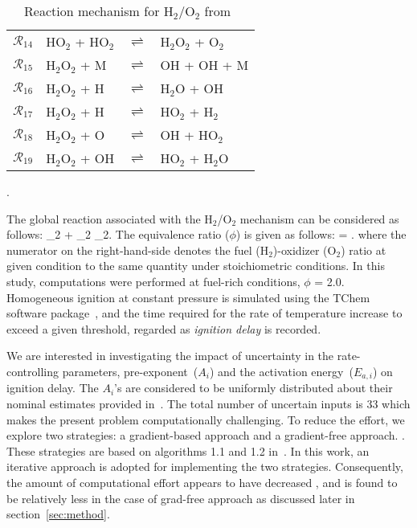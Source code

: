 \begin{table}[htbp]
\begin{center}
\begin{tabular}{llll}
$\mathcal{R}_{14}$ & HO$_2$ + HO$_2$ & $\rightleftharpoons$ & H$_2$O$_2$ + O$_2$ \\
$\mathcal{R}_{15}$ & H$_2$O$_2$ + M  & $\rightleftharpoons$ & OH + OH + M \\
$\mathcal{R}_{16}$ & H$_2$O$_2$ + H  & $\rightleftharpoons$ & H$_2$O + OH \\
$\mathcal{R}_{17}$ & H$_2$O$_2$ + H  & $\rightleftharpoons$ & HO$_2$ + H$_2$ \\
$\mathcal{R}_{18}$ & H$_2$O$_2$ + O  & $\rightleftharpoons$ & OH + HO$_2$ \\
$\mathcal{R}_{19}$ & H$_2$O$_2$ + OH & $\rightleftharpoons$ & HO$_2$ + H$_2$O \\
\bottomrule
\end{tabular}
\end{center}
\caption{Reaction mechanism for H$_2$/O$_2$ from~\cite{Yetter:1991}}.
\label{tab:kinetics}
\end{table}

The global reaction associated with the H$_2$/O$_2$ mechanism can
be considered as follows:
_2 + _2 _2.
\label{eq:global}
\ee 
The equivalence ratio ($\phi$) is given as follows:
%
\be
\phi = .
\label{eq:phi}
\ee
%
where the numerator on the right-hand-side denotes the fuel (H$_2$)-oxidizer
(O$_2$) ratio at given condition to the same quantity under stoichiometric
conditions. In this study, computations were performed at fuel-rich conditions,
$\phi$ = 2.0. Homogeneous ignition at constant pressure is simulated using the
TChem software package~\cite{Safta:2011}, and the time required for the rate of
temperature increase to exceed a given threshold, regarded as \emph{ignition delay}
is recorded. 

We are interested in investigating the impact of uncertainty in the
rate-controlling parameters, pre-exponent~($A_i$) and the activation
energy~($E_{a,i}$) on ignition delay. The $A_i$'s are considered to be
uniformly distributed about their nominal estimates provided
in~\cite{Yetter:1991}.  The total number of uncertain inputs is 33 which makes
the present problem computationally challenging. 
To reduce the effort, we explore two
strategies: 
a gradient-based approach and  
a gradient-free approach.
. 
%
These strategies are based on algorithms 1.1 and 1.2 
in~\cite{Constantine:2015}. In this work, an
iterative approach is adopted for implementing the two strategies.
Consequently, the amount of computational effort appears to have decreased
, and
is found to be relatively less in the case of grad-free approach as discussed
later in section~\ref{sec:method}.

